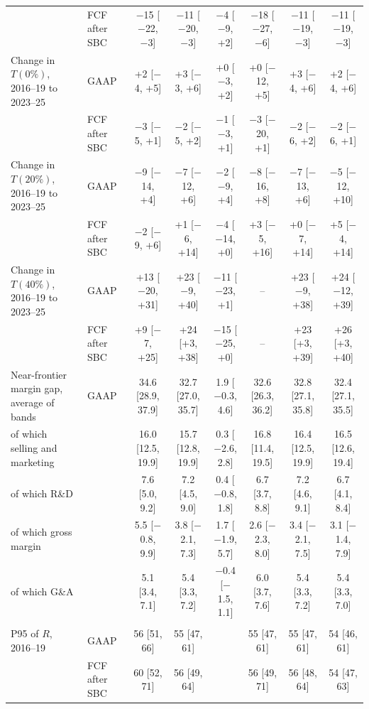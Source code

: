 \begin{table}[t]
{\begin{tabular}{llcccccc}
 & FCF after SBC & $-$15 [$-$22, $-$3] & $-$11 [$-$20, $-$3] & $-$4 [$-$9, +2] & $-$18 [$-$27, $-$6] & $-$11 [$-$19, $-$3] & $-$11 [$-$19, $-$3] \\
Change in $T(0\%)$, 2016--19 to 2023--25 & GAAP & +2 [$-$4, +5] & +3 [$-$3, +6] & +0 [$-$3, +2] & +0 [$-$12, +5] & +3 [$-$4, +6] & +2 [$-$4, +6] \\
 & FCF after SBC & $-$3 [$-$5, +1] & $-$2 [$-$5, +2] & $-$1 [$-$3, +1] & $-$3 [$-$20, +1] & $-$2 [$-$6, +2] & $-$2 [$-$6, +1] \\
Change in $T(20\%)$, 2016--19 to 2023--25 & GAAP & $-$9 [$-$14, +4] & $-$7 [$-$12, +6] & $-$2 [$-$9, +4] & $-$8 [$-$16, +8] & $-$7 [$-$13, +6] & $-$5 [$-$12, +10] \\
 & FCF after SBC & $-$2 [$-$9, +6] & +1 [$-$6, +14] & $-$4 [$-$14, +0] & +3 [$-$5, +16] & +0 [$-$7, +14] & +5 [$-$4, +14] \\
Change in $T(40\%)$, 2016--19 to 2023--25 & GAAP & +13 [$-$20, +31] & +23 [$-$9, +40] & $-$11 [$-$23, +1] & -- & +23 [$-$9, +38] & +24 [$-$12, +39] \\
 & FCF after SBC & +9 [$-$7, +25] & +24 [+3, +38] & $-$15 [$-$25, +0] & -- & +23 [+3, +39] & +26 [+3, +40] \\
Near-frontier margin gap, average of bands & GAAP & 34.6 [28.9, 37.9] & 32.7 [27.0, 35.7] & 1.9 [$-$0.3, 4.6] & 32.6 [26.3, 36.2] & 32.8 [27.1, 35.8] & 32.4 [27.1, 35.5] \\
\quad of which selling and marketing &  & 16.0 [12.5, 19.9] & 15.7 [12.8, 19.9] & 0.3 [$-$2.6, 2.8] & 16.8 [11.4, 19.5] & 16.4 [12.5, 19.9] & 16.5 [12.6, 19.4] \\
\quad of which R\&D &  & 7.6 [5.0, 9.2] & 7.2 [4.5, 9.0] & 0.4 [$-$0.8, 1.8] & 6.7 [3.7, 8.8] & 7.2 [4.6, 9.1] & 6.7 [4.1, 8.4] \\
\quad of which gross margin &  & 5.5 [$-$0.8, 9.9] & 3.8 [$-$2.1, 7.3] & 1.7 [$-$1.9, 5.7] & 2.6 [$-$2.3, 8.0] & 3.4 [$-$2.1, 7.5] & 3.1 [$-$1.4, 7.9] \\
\quad of which G\&A &  & 5.1 [3.4, 7.1] & 5.4 [3.3, 7.2] & $-$0.4 [$-$1.5, 1.1] & 6.0 [3.7, 7.6] & 5.4 [3.3, 7.2] & 5.4 [3.3, 7.0] \\
\addlinespace\multicolumn{8}{l}{\emph{B. Distribution of reported scores (E1 primary)}}\\
P95 of $R$, 2016--19 & GAAP & 56 [51, 66] & 55 [47, 61] &  & 55 [47, 61] & 55 [47, 61] & 54 [46, 61] \\
 & FCF after SBC & 60 [52, 71] & 56 [49, 64] &  & 56 [49, 71] & 56 [48, 64] & 54 [47, 63] \\

\end{tabular}}
\end{table}
